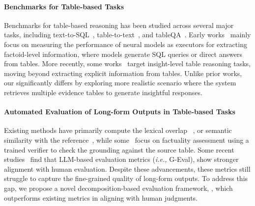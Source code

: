 \paragraph{Benchmarks for Table-based Tasks}
Benchmarks for table-based reasoning has been studied across several major tasks, including text-to-SQL~\citep{zhong2018seqsql}, table-to-text~\citep{Parikh2020ToTToAC}, and tableQA~\citep{pasupat-liang-2015-compositional}.
Early works~\citep{Yu2018SpiderAL,Nan2021FeTaQAFT} mainly focus on measuring the performance of neural models as executors for extracting factoid-level information, where models generate SQL queries or direct answers from tables.
More recently, some works~\citep{Zhao2023QTSummAN,Seo2024UnveilingIT} target insight-level table reasoning tasks, moving beyond extracting explicit information from tables.
Unlike prior works, our \bench significantly differs by exploring more realistic scenario where the system retrieves multiple evidence tables to generate insightful responses.
\paragraph{Automated Evaluation of Long-form Outputs in Table-based Tasks}
Existing methods have primarily compute the lexical overlap ~\citep{Post2018ACF}, or  semantic similarity with the reference~\citep{Zhang2019BERTScoreET}, while some~\citep{Liu2022PLOGTP} focus on factuality assessment using a trained verifier to check the grounding against the source table.
Some recent studies~\citep{zhao-etal-2024-tapera,wang-etal-2024-revisiting} find that LLM-based evaluation metrics (\textit{i.e.,} G-Eval), show stronger alignment with human evaluation.
Despite these advancements, these metrics still struggle to capture the fine-grained quality of long-form outputs. To address this gap, we propose a novel decomposition-based evaluation framework, \eval, which outperforms existing metrics in aligning with human judgments.

